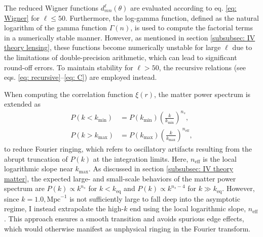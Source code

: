 \documentclass{aa}
\numberwithin{equation}{section}
\numberwithin{table}{section}
\numberwithin{figure}{section}
\begin{document}
The reduced Wigner functions $d^\ell_{mn}(\theta)$ are evaluated according to eq. \eqref{eq: Wigner} for $\ell \leq 50$. Furthermore, the log-gamma function, defined as the natural logarithm of the gamma function $\Gamma(n)$, is used to compute the factorial terms in a numerically stable manner. However, as mentioned in section \ref{subsubsec: IV theory lensing}, these functions become numerically unstable for large $\ell$ due to the limitations of double-precision arithmetic, which can lead to significant round-off errors. To maintain stability for $\ell > 50$, the recursive relations (see eqs. \eqref{eq: recursive}--\eqref{eq: C}) are employed instead.

When computing the correlation function $\xi(r)$, the matter power spectrum is extended as
\begin{align*}
P(k < k_{\text{min}}) &= P(k_{\text{min}})\left(\frac{k}{k_{\text{min}}}\right)^{n_s}, \\
P(k > k_{\text{max}}) &= P(k_{\text{max}})\left(\frac{k}{k_{\text{max}}}\right)^{n_{\text{eff}}},
\end{align*}
to reduce Fourier ringing, which refers to oscillatory artifacts resulting from the abrupt truncation of $P(k)$ at the integration limits. Here, $n_{\text{eff}}$ is the local logarithmic slope near $k_{\text{max}}$. As discussed in section \ref{subsubsec: IV theory matter}, the expected large- and small-scale behaviors of the matter power spectrum are $P(k) \propto k^{n_s}$ for $k < k_{\text{eq}}$ and $P(k) \propto k^{n_s - 4}$ for $k \gg k_{\text{eq}}$. However, since $k = 1.0,\text{Mpc}^{-1}$ is not sufficiently large to fall deep into the asymptotic regime, I instead extrapolate the high-$k$ end using the local logarithmic slope, $n_{\text{eff}}$. This approach ensures a smooth transition and avoids spurious edge effects, which would otherwise manifest as unphysical ringing in the Fourier transform. 
\end{document}
